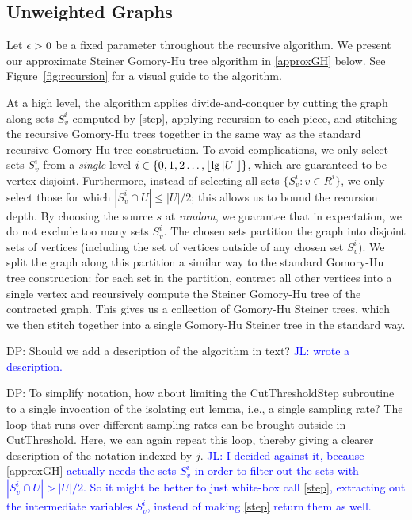 \subsection{Unweighted Graphs}

Let $\epsilon>0$ be a fixed parameter throughout the recursive algorithm. We present our approximate Steiner Gomory-Hu tree algorithm in \ref{approxGH} below.
See Figure~\ref{fig:recursion} for a visual guide to the algorithm.

At a high level, the algorithm applies divide-and-conquer by cutting the graph along sets $S^i_v$ computed by \ref{step}, applying recursion to each piece, and stitching the recursive Gomory-Hu trees together in the same way as the standard recursive Gomory-Hu tree construction. To avoid complications, we only select sets $S^i_v$ from a \emph{single} level $i\in\{0,1,2\ldots,\lfloor\lg|U|\rfloor\}$, which are guaranteed to be vertex-disjoint. Furthermore, instead of selecting all sets $\{S^i_v:v\in R^i\}$, we only select those for which $|S^i_v\cap U|\le|U|/2$; this allows us to bound the recursion depth. By choosing the source $s$ at \emph{random}, we guarantee that in expectation, we do not exclude too many sets $S^i_v$. The chosen sets partition the graph into disjoint sets of vertices (including the set of vertices outside of any chosen set $S^i_v$). We split the graph along this partition a similar way to the standard Gomory-Hu tree construction: for each set in the partition, contract all other vertices into a single vertex and recursively compute the Steiner Gomory-Hu tree of the contracted graph. This gives us a collection of Gomory-Hu Steiner trees, which we then stitch together into a single Gomory-Hu Steiner tree in the standard way.

\alert{DP: Should we add a description of the algorithm in text?} \textcolor{blue}{JL: wrote a description.}

\alert{DP: To simplify notation, how about limiting the CutThresholdStep subroutine to a single invocation of the isolating cut lemma, i.e., a single sampling rate? The loop that runs over different sampling rates can be brought outside in CutThreshold. Here, we can again repeat this loop, thereby giving a clearer description of the notation indexed by $j$.}
\textcolor{blue}{JL: I decided against it, because \ref{approxGH} actually needs the sets $S^i_v$ in order to filter out the sets with $|S^i_v\cap U|>|U|/2$. So it might be better to just white-box call \ref{step}, extracting out the intermediate variables $S^i_v$, instead of making \ref{step} return them as well.}



